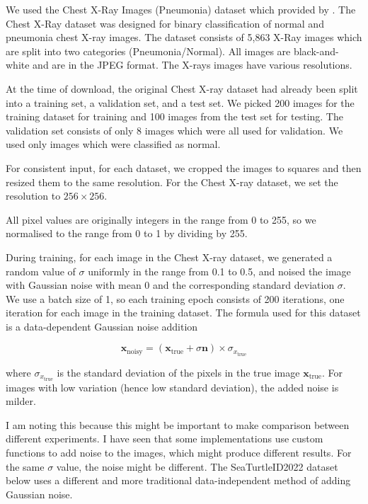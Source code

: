 \documentclass[12pt]{article}
\begin{document}
We used the Chest X-Ray Images (Pneumonia) dataset which provided by \cite{kermany2018large}.
The Chest X-Ray dataset was designed for binary classification of normal and pneumonia chest X-ray images. 
The dataset consists of 5,863 X-Ray images which are split into two categories (Pneumonia/Normal).
All images are black-and-white and are in the JPEG format.
The X-rays images have various resolutions.



At the time of download, the original Chest X-ray dataset had already been split into a training set, a validation set, and a test set.
We picked 200 images for the training dataset for training and 100 images from the test set for testing. The validation set consists of only 8 images which were all used for validation.
We used only images which were classified as normal.

 

For consistent input, for each dataset, we cropped the images to squares and then resized them to the same resolution.
For the Chest X-ray dataset, we set the resolution to $256 \times 256$.

All pixel values are originally integers in the range from 0 to 255, so we normalised to the range from 0 to 1 by dividing by 255.


During training, for each image in the Chest X-ray dataset, we generated a random value of $\sigma$ uniformly in the range from 0.1 to 0.5, and noised the image with Gaussian noise with mean 0 and the corresponding standard deviation $\sigma$.
We use a batch size of 1, so each training epoch consists of 200 iterations, one iteration for each image in the training dataset.
The formula used for this dataset is a data-dependent Gaussian noise addition

\begin{equation}
    \mathbf{x}_{\text{noisy}} = (\mathbf{x}_{\text{true}} + \sigma \mathbf{n}) \times \sigma_{x_{\text{true}}}
    \label{eq:data-dependent-noise}
\end{equation}

where $\sigma_{x_{\text{true}}}$ is the standard deviation of the pixels in the true image $\mathbf{x}_{\text{true}}$.
For images with low variation (hence low standard deviation), the added noise is milder.

I am noting this because this might be important to make comparison between different experiments.
I have seen that some implementations use custom functions to add noise to the images, 
which might produce different results.
For the same $\sigma$ value, the noise might be different.
The SeaTurtleID2022 dataset below uses a different and more traditional data-independent method of adding Gaussian noise.
\end{document}
